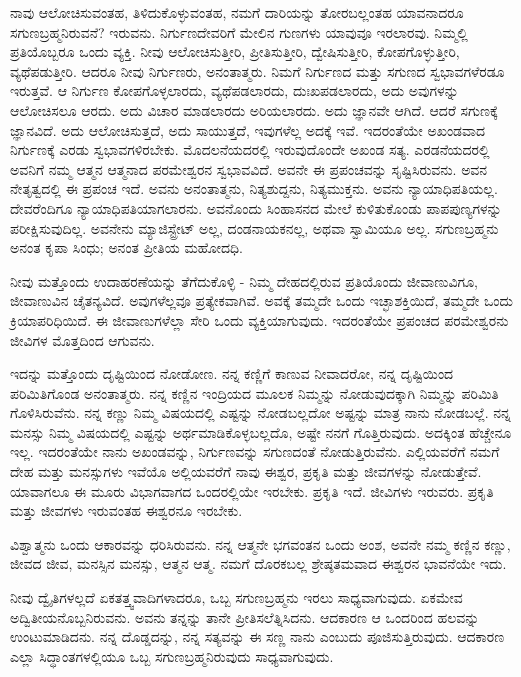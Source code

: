 ನಾವು ಆಲೋಚಿಸುವಂತಹ, ತಿಳಿದುಕೊಳ್ಳುವಂತಹ, ನಮಗೆ ದಾರಿಯನ್ನು ತೋರಬಲ್ಲಂತಹ ಯಾವನಾದರೂ ಸಗುಣಬ್ರಹ್ಮನಿರುವನೆ? ಇರುವನು. ನಿರ್ಗುಣದೇವರಿಗೆ ಮೇಲಿನ ಗುಣಗಳು ಯಾವುವೂ ಇರಲಾರವು. ನಿಮ್ಮಲ್ಲಿ ಪ್ರತಿಯೊಬ್ಬರೂ ಒಂದು ವ್ಯಕ್ತಿ. ನೀವು ಆಲೋಚಿಸುತ್ತೀರಿ, ಪ್ರೀತಿಸುತ್ತೀರಿ, ದ್ವೇಷಿಸುತ್ತೀರಿ, ಕೋಪಗೊಳ್ಳುತ್ತೀರಿ, ವ್ಯಥೆಪಡುತ್ತೀರಿ. ಆದರೂ ನೀವು ನಿರ್ಗುಣರು, ಅನಂತಾತ್ಮರು. ನಿಮಗೆ ನಿರ್ಗುಣದ ಮತ್ತು ಸಗುಣದ ಸ್ವಭಾವಗಳೆರಡೂ ಇರುತ್ತವೆ. ಆ ನಿರ್ಗುಣ ಕೋಪಗೊಳ್ಳಲಾರದು, ವ್ಯಥೆಪಡಲಾರದು, ದುಃಖಪಡಲಾರದು, ಅದು ಅವುಗಳನ್ನು ಆಲೋಚಿಸಲೂ ಆರದು. ಅದು ವಿಚಾರ ಮಾಡಲಾರದು ಅರಿಯಲಾರದು. ಅದು ಜ್ಞಾನವೇ ಆಗಿದೆ. ಆದರೆ ಸಗುಣಕ್ಕೆ ಜ್ಞಾನವಿದೆ. ಅದು ಆಲೋಚಿಸುತ್ತದೆ, ಅದು ಸಾಯುತ್ತದೆ, ಇವುಗಳೆಲ್ಲ ಅದಕ್ಕೆ ಇವೆ. ಇದರಂತೆಯೇ ಅಖಂಡವಾದ ನಿರ್ಗುಣಕ್ಕೆ ಎರಡು ಸ್ವಭಾವಗಳಿರಬೇಕು. ಮೊದಲನೆಯದರಲ್ಲಿ ಇರುವುದೊಂದೇ ಅಖಂಡ ಸತ್ಯ. ಎರಡನೆಯದರಲ್ಲಿ ಅವನಿಗೆ ನಮ್ಮ ಆತ್ಮನ ಆತ್ಮನಾದ ಪರಮೇಶ್ವರನ ಸ್ವಭಾವವಿದೆ. ಅವನೇ ಈ ಪ್ರಪಂಚವನ್ನು ಸೃಷ್ಟಿಸಿರುವನು. ಅವನ ನೇತೃತ್ವದಲ್ಲಿ ಈ ಪ್ರಪಂಚ ಇದೆ. ಅವನು ಅನಂತಾತ್ಮನು, ನಿತ್ಯಶುದ್ದನು, ನಿತ್ಯಮುಕ್ತನು. ಅವನು ನ್ಯಾಯಾಧಿಪತಿಯಲ್ಲ. ದೇವರೆಂದಿಗೂ ನ್ಯಾಯಾಧಿಪತಿಯಾಗಲಾರನು. ಅವನೊಂದು ಸಿಂಹಾಸನದ ಮೇಲೆ ಕುಳಿತುಕೊಂಡು ಪಾಪಪುಣ್ಯಗಳನ್ನು ಪರೀಕ್ಷಿಸುವುದಿಲ್ಲ. ಅವನೇನು ಮ್ಯಾಜಿಸ್ಟ್ರೇಟ್ ಅಲ್ಲ, ದಂಡನಾಯಕನಲ್ಲ, ಅಥವಾ ಸ್ವಾಮಿಯೂ ಅಲ್ಲ. ಸಗುಣಬ್ರಹ್ಮನು ಅನಂತ ಕೃಪಾ ಸಿಂಧು; ಅನಂತ ಪ್ರೀತಿಯ ಮಹೋದಧಿ.

ನೀವು ಮತ್ತೊಂದು ಉದಾಹರಣೆಯನ್ನು ತೆಗೆದುಕೊಳ್ಳಿ - ನಿಮ್ಮ ದೇಹದಲ್ಲಿರುವ ಪ್ರತಿಯೊಂದು ಜೀವಾಣುವಿಗೂ, ಜೀವಾಣುವಿನ ಚೈತನ್ಯವಿದೆ. ಅವುಗಳೆಲ್ಲವೂ ಪ್ರತ್ಯೇಕವಾಗಿವೆ. ಅವಕ್ಕೆ ತಮ್ಮದೇ ಒಂದು ಇಚ್ಛಾಶಕ್ತಿಯಿದೆ, ತಮ್ಮದೇ ಒಂದು ಕ್ರಿಯಾಪರಿಧಿಯಿದೆ. ಈ ಜೀವಾಣುಗಳೆಲ್ಲಾ ಸೇರಿ ಒಂದು ವ್ಯಕ್ತಿಯಾಗುವುದು. ಇದರಂತೆಯೇ ಪ್ರಪಂಚದ ಪರಮೇಶ್ವರನು ಜೀವಿಗಳ ಮೊತ್ತದಿಂದ ಆಗುವನು.

ಇದನ್ನು ಮತ್ತೊಂದು ದೃಷ್ಟಿಯಿಂದ ನೋಡೋಣ. ನನ್ನ ಕಣ್ಣಿಗೆ ಕಾಣುವ ನೀವಾದರೋ, ನನ್ನ ದೃಷ್ಟಿಯಿಂದ ಪರಿಮಿತಿಗೊಂಡ ಅನಂತಾತ್ಮರು. ನನ್ನ ಕಣ್ಣಿನ ಇಂದ್ರಿಯದ ಮೂಲಕ ನಿಮ್ಮನ್ನು ನೋಡುವುದಕ್ಕಾಗಿ ನಿಮ್ಮನ್ನು ಪರಿಮಿತಿ ಗೊಳಿಸಿರುವೆನು. ನನ್ನ ಕಣ್ಣು ನಿಮ್ಮ ವಿಷಯದಲ್ಲಿ ಎಷ್ಟನ್ನು ನೋಡಬಲ್ಲದೋ ಅಷ್ಟನ್ನು ಮಾತ್ರ ನಾನು ನೋಡಬಲ್ಲೆ. ನನ್ನ ಮನಸ್ಸು ನಿಮ್ಮ ವಿಷಯದಲ್ಲಿ ಎಷ್ಟನ್ನು ಅರ್ಥಮಾಡಿಕೊಳ್ಳಬಲ್ಲದೊ, ಅಷ್ಟೇ ನನಗೆ ಗೊತ್ತಿರುವುದು. ಅದಕ್ಕಿಂತ ಹೆಚ್ಚೇನೂ ಇಲ್ಲ. ಇದರಂತೆಯೇ ನಾನು ಅಖಂಡವನ್ನು, ನಿರ್ಗುಣವನ್ನು ಸಗುಣದಂತೆ ನೋಡುತ್ತಿರುವೆನು. ಎಲ್ಲಿಯವರೆಗೆ ನಮಗೆ ದೇಹ ಮತ್ತು ಮನಸ್ಸುಗಳು ಇವೆಯೊ ಅಲ್ಲಿಯವರೆಗೆ ನಾವು ಈಶ್ವರ, ಪ್ರಕೃತಿ ಮತ್ತು ಜೀವಗಳನ್ನು ನೋಡುತ್ತೇವೆ. ಯಾವಾಗಲೂ ಈ ಮೂರು ವಿಭಾಗವಾಗದ ಒಂದರಲ್ಲಿಯೇ ಇರಬೇಕು. ಪ್ರಕೃತಿ ಇದೆ. ಜೀವಿಗಳು ಇರುವರು. ಪ್ರಕೃತಿ ಮತ್ತು ಜೀವಗಳು ಇರುವಂತಹ ಈಶ್ವರನೂ ಇರಬೇಕು.

ವಿಶ್ವಾತ್ಮನು ಒಂದು ಆಕಾರವನ್ನು ಧರಿಸಿರುವನು. ನನ್ನ ಆತ್ಮನೇ ಭಗವಂತನ ಒಂದು ಅಂಶ, ಅವನೇ ನಮ್ಮ ಕಣ್ಣಿನ ಕಣ್ಣು, ಜೀವದ ಜೀವ, ಮನಸ್ಸಿನ ಮನಸ್ಸು, ಆತ್ಮನ ಆತ್ಮ. ನಮಗೆ ದೊರಕಬಲ್ಲ ಶ್ರೇಷ್ಠತಮವಾದ ಈಶ್ವರನ ಭಾವನೆಯೇ ಇದು.

ನೀವು ದ್ವೈತಿಗಳಲ್ಲದೆ ಏಕತತ್ತ್ವವಾದಿಗಳಾದರೂ, ಒಬ್ಬ ಸಗುಣಬ್ರಹ್ಮನು ಇರಲು ಸಾಧ್ಯವಾಗುವುದು. ಏಕಮೇವ ಅದ್ವಿತೀಯನೊಬ್ಬನಿರುವನು. ಅವನು ತನ್ನನ್ನು ತಾನೇ ಪ್ರೀತಿಸಲೆತ್ನಿಸಿದನು. ಆದಕಾರಣ ಆ ಒಂದರಿಂದ ಹಲವನ್ನು ಉಂಟುಮಾಡಿದನು. ನನ್ನ ದೊಡ್ಡದನ್ನು, ನನ್ನ ಸತ್ಯವನ್ನು ಈ ಸಣ್ಣ ನಾನು ಎಂಬುದು ಪೂಜಿಸುತ್ತಿರುವುದು. ಆದಕಾರಣ ಎಲ್ಲಾ ಸಿದ್ಧಾಂತಗಳಲ್ಲಿಯೂ ಒಬ್ಬ ಸಗುಣಬ್ರಹ್ಮನಿರುವುದು ಸಾಧ್ಯವಾಗುವುದು.

